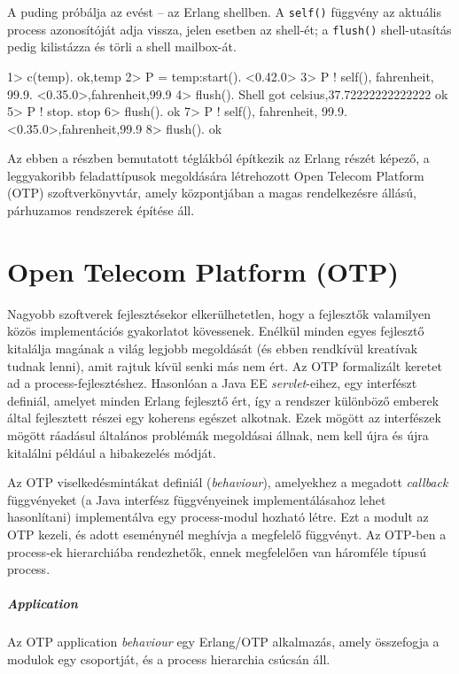 \documentclass[12pt, a4paper, oneside]{book}
\begin{document}
A puding próbálja az evést -- az Erlang shellben. A \texttt{self()} függvény az
aktuális process azonosítóját adja vissza, jelen esetben az shell-ét; a
\texttt{flush()} shell-utasítás pedig kilistázza és törli a shell mailbox-át.

\begin{code}{}{}
1> c(temp).
{ok,temp}
2> P = temp:start().
<0.42.0>
3> P ! {self(), fahrenheit, 99.9}.
{<0.35.0>,fahrenheit,99.9}
4> flush().
Shell got {celsius,37.72222222222222}
ok
5> P ! stop.                      
stop
6> flush(). 
ok
7> P ! {self(), fahrenheit, 99.9}.
{<0.35.0>,fahrenheit,99.9}
8> flush().                       
ok
\end{code}

Az ebben a részben bemutatott téglákból építkezik az Erlang részét képező,
a leggyakoribb feladattípusok megoldására létrehozott Open Telecom Platform 
(OTP) szoftverkönyvtár, amely központjában a magas rendelkezésre állású,
párhuzamos rendszerek építése áll.

\section{Open Telecom Platform (OTP)} Nagyobb szoftverek fejlesztésekor
elkerülhetetlen, hogy a fejlesztők valamilyen közös implementációs gyakorlatot
kövessenek. Enélkül minden egyes fejlesztő kitalálja magának a világ legjobb
megoldását (és ebben rendkívül kreatívak tudnak lenni), amit rajtuk kívül senki
más nem ért. Az OTP formalizált keretet ad a process-fejlesztéshez. Hasonlóan a
Java EE \emph{servlet}-eihez, egy interfészt definiál, amelyet minden Erlang
fejlesztő ért, így a rendszer különböző emberek által fejlesztett részei egy
koherens egészet alkotnak. Ezek mögött az interfészek mögött ráadásul általános
problémák megoldásai állnak, nem kell újra és újra kitalálni például a
hibakezelés módját.

Az OTP viselkedésmintákat definiál (\emph{behaviour}), amelyekhez a megadott
\emph{callback} függvényeket (a Java interfész függvényeinek implementálásahoz
lehet hasonlítani) implementálva egy process-modul hozható létre. Ezt a modult
az OTP kezeli, és adott eseménynél meghívja a megfelelő függvényt. Az OTP-ben a
process-ek hierarchiába rendezhetők, ennek megfelelően van háromféle típusú
process.

\subparagraph{Application} Az OTP application \emph{behaviour} egy Erlang/OTP
alkalmazás, amely összefogja a modulok egy csoportját, és a process hierarchia
csúcsán áll.
\end{document}
